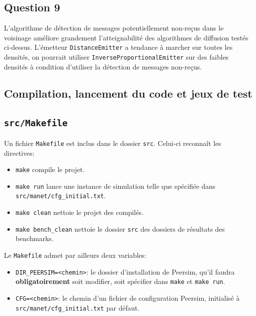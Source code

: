 \documentclass[a4paper]{article}
\begin{document}
\pagebreak

\subsection{Question 9}
L'algorithme de détection de messages potentiellement non-reçus dans
le voisinage améliore grandement l'atteignabilité des algorithmes de
diffusion testés ci-dessus. L'émetteur \texttt{DistanceEmitter} a
tendance à marcher sur toutes les densités, on pourrait utiliser
\texttt{InverseProportionalEmitter} sur des faibles densités à
condition d'utiliser la détection de messages non-reçus.

\begin{appendix}
  \section{Compilation, lancement du code et jeux de test}
  \subsection{\texttt{src/Makefile}}
    Un fichier \texttt{Makefile} est inclus dans le dossier
    \texttt{src}. Celui-ci reconnaît les directives:
    \begin{itemize}
    \item \texttt{make} compile le projet.
    \item \texttt{make run} lance une instance de simulation telle que
      spécifiée dans \texttt{src/manet/cfg\_initial.txt}.
    \item \texttt{make clean} nettoie le projet des compilés.
    \item \texttt{make bench\_clean} nettoie le dossier \texttt{src}
      des dossiers de résultats des benchmarks.\\
    \end{itemize}

    Le \texttt{Makefile} admet par ailleurs deux variables:
    \begin{itemize}
    \item \texttt{DIR\_PEERSIM=<chemin>}: le dossier d'installation de
      Peersim, qu'il faudra \textbf{obligatoirement} soit modifier,
      soit spécifier dans \texttt{make} et \texttt{make run}.
    \item \texttt{CFG=<chemin>}: le chemin d'un fichier de
      configuration Peersim, initialisé à \texttt{src/manet/cfg\_initial.txt} par défaut.
    \end{itemize}


\end{appendix}
\end{document}
